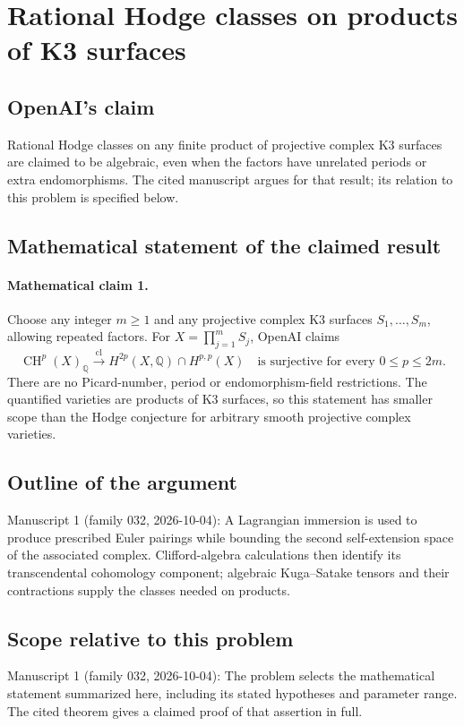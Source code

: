 \documentclass[11pt]{article}
\begin{document}
\section*{Rational Hodge classes on products of K3 surfaces}

\subsection{OpenAI's claim}
Rational Hodge classes on any finite product of projective complex K3 surfaces are claimed to be algebraic, even when the factors have unrelated periods or extra endomorphisms. The cited manuscript argues for that result; its relation to this problem is specified below.

\subsection{Mathematical statement of the claimed result}
\paragraph{Mathematical claim 1.} Choose any integer $m\ge1$ and any projective complex K3 surfaces $S_1,\ldots,S_m$, allowing repeated factors. For $X=\prod_{j=1}^m S_j$, OpenAI claims
\[
\operatorname{CH}^p(X)_{\mathbb Q}\xrightarrow{\operatorname{cl}}
H^{2p}(X,\mathbb Q)\cap H^{p,p}(X)
\quad\text{is surjective for every }0\le p\le2m.
\]
There are no Picard-number, period or endomorphism-field restrictions. The quantified varieties are products of K3 surfaces, so this statement has smaller scope than the Hodge conjecture for arbitrary smooth projective complex varieties.

\subsection{Outline of the argument}
Manuscript 1 (family 032, 2026-10-04): A Lagrangian immersion is used to produce prescribed Euler pairings while bounding the second self-extension space of the associated complex. Clifford-algebra calculations then identify its transcendental cohomology component; algebraic Kuga--Satake tensors and their contractions supply the classes needed on products.

\subsection{Scope relative to this problem}
Manuscript 1 (family 032, 2026-10-04): The problem selects the mathematical statement summarized here, including its stated hypotheses and parameter range. The cited theorem gives a claimed proof of that assertion in full.
\end{document}
